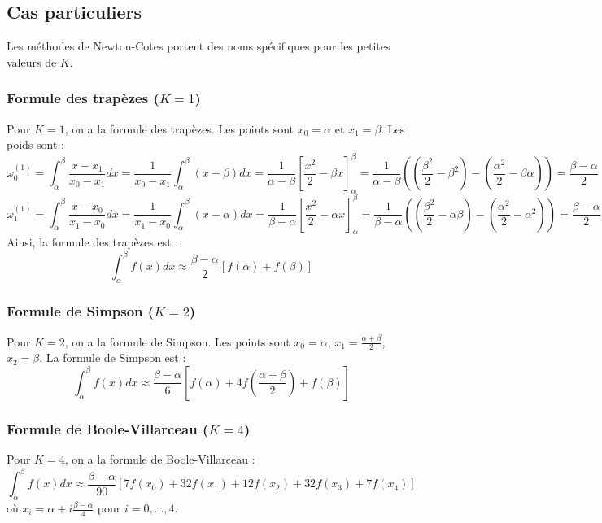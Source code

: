 \documentclass{article}
\begin{document}
\subsection{Cas particuliers}

Les méthodes de Newton-Cotes portent des noms spécifiques pour les petites valeurs de $K$.

\subsubsection{Formule des trapèzes ($K=1$)}

Pour $K=1$, on a la formule des trapèzes. Les points sont $x_0 = \alpha$ et $x_1 = \beta$. Les poids sont :
\[
\omega_0^{(1)} = \int_{\alpha}^{\beta} \frac{x-x_1}{x_0-x_1} dx = \frac{1}{x_0-x_1} \int_{\alpha}^{\beta} (x-\beta) dx = \frac{1}{\alpha-\beta} \left[ \frac{x^2}{2} - \beta x \right]_{\alpha}^{\beta} = \frac{1}{\alpha-\beta} \left( (\frac{\beta^2}{2} - \beta^2) - (\frac{\alpha^2}{2} - \beta \alpha) \right) = \frac{\beta - \alpha}{2}
\]
\[
\omega_1^{(1)} = \int_{\alpha}^{\beta} \frac{x-x_0}{x_1-x_0} dx = \frac{1}{x_1-x_0} \int_{\alpha}^{\beta} (x-\alpha) dx = \frac{1}{\beta-\alpha} \left[ \frac{x^2}{2} - \alpha x \right]_{\alpha}^{\beta} = \frac{1}{\beta-\alpha} \left( (\frac{\beta^2}{2} - \alpha \beta) - (\frac{\alpha^2}{2} - \alpha^2) \right) = \frac{\beta - \alpha}{2}
\]
Ainsi, la formule des trapèzes est :
\[
\int_{\alpha}^{\beta} f(x) dx \approx \frac{\beta - \alpha}{2} [f(\alpha) + f(\beta)]
\]

\subsubsection{Formule de Simpson ($K=2$)}

Pour $K=2$, on a la formule de Simpson. Les points sont $x_0 = \alpha$, $x_1 = \frac{\alpha + \beta}{2}$, $x_2 = \beta$. La formule de Simpson est :
\[
\int_{\alpha}^{\beta} f(x) dx \approx \frac{\beta - \alpha}{6} \left[ f(\alpha) + 4 f\left(\frac{\alpha + \beta}{2}\right) + f(\beta) \right]
\]

\subsubsection{Formule de Boole-Villarceau ($K=4$)}

Pour $K=4$, on a la formule de Boole-Villarceau :
\[
\int_{\alpha}^{\beta} f(x) dx \approx \frac{\beta - \alpha}{90} \left[ 7f(x_0) + 32f(x_1) + 12f(x_2) + 32f(x_3) + 7f(x_4) \right]
\]
où $x_i = \alpha + i \frac{\beta-\alpha}{4}$ pour $i=0, \dots, 4$.
\end{document}
